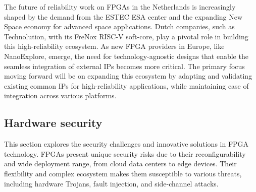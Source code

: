 The future of reliability work on FPGAs in the Netherlands is increasingly shaped by the demand from the ESTEC ESA center and the expanding New Space economy for advanced space applications. Dutch companies, such as Technolution, with its FreNox RISC-V soft-core, play a pivotal role in building this high-reliability ecosystem. As new FPGA providers in Europe, like NanoExplore, emerge, the need for technology-agnostic designs that enable the seamless integration of external IPs becomes more critical. The primary focus moving forward will be on expanding this ecosystem by adapting and validating existing common IPs for high-reliability applications, while maintaining ease of integration across various platforms.


\subsection{Hardware security}
\label{securitysec}

This section explores the security challenges and innovative solutions in FPGA technology.
FPGAs present unique security risks due to their reconfigurability and wide deployment range, from cloud data centers to edge devices. Their flexibility and complex ecosystem makes them susceptible to various threats, including hardware Trojans, fault injection, and side-channel attacks. 





